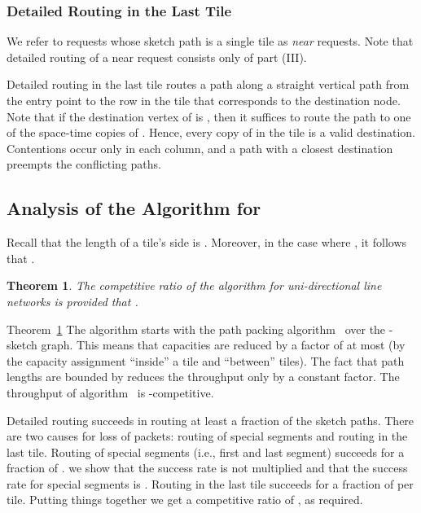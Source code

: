 \documentclass[11pt]{article}
\newtheorem{theorem}{Theorem}
\newcommand{\route}{\text{\sc{ipp}}}
\newcommand{\IPP}{\route}
\newenvironment{proof sketch}[1]{\noindent {\emph{Proof sketch of #1:}}}{\hfill \qed}
\begin{document}
\subsubsection{Detailed Routing in the Last Tile}
We refer to requests whose sketch path is a single tile as \emph{near} requests.
Note that detailed routing of a near request consists only of part (III).

Detailed routing in the last tile routes a path along a straight vertical path from
the entry point to the row in the tile that corresponds to the destination node.
Note that if the destination vertex of  is , then it suffices to route the
path to one of the space-time copies of . Hence, every copy of  in the tile
is a valid destination. Contentions occur only in each column, and a path with a
closest destination preempts the conflicting paths.

\subsection{Analysis of the Algorithm for }\label{sec:analysis}

Recall that the length of a tile's side is . Moreover, in the case where  , it follows that .



\begin{theorem}\label{thm:alg}
  The competitive ratio of the algorithm for uni-directional line networks is  provided
  that .
\end{theorem}

\begin{proof sketch}{Theorem~\ref{thm:alg}}
The algorithm starts with the path packing algorithm \IPP\ over the -sketch graph.
This means that capacities are reduced by a factor of at most  (by the capacity assignment ``inside'' a tile and ``between'' tiles).
The fact that path lengths are bounded by  reduces the throughput only by a constant factor. The throughput of algorithm \IPP\ is -competitive.

Detailed routing succeeds in routing at least a  fraction of the sketch paths. There are two causes for loss of packets: routing of special segments and routing in the last tile.
Routing of special segments (i.e., first and last segment) succeeds for a fraction of .
we show that the success rate is not multiplied and that the success rate for special segments is . Routing in the last tile succeeds for a fraction of  per tile.
Putting things together we get a competitive ratio of , as required.
\end{proof sketch}
\end{document}
